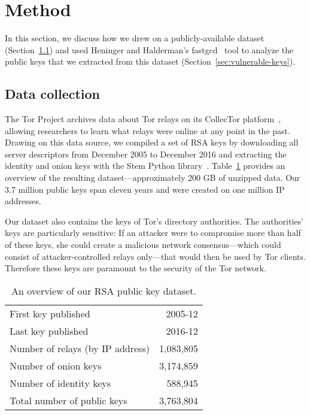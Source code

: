 \section{Method}
\label{sec:method}
In this section, we discuss how we drew on a publicly-available dataset
(Section~\ref{sec:data-collection}) and used Heninger and Halderman's 
fastgcd~\cite{fastgcd} tool to analyze the public keys that 
we extracted from this dataset (Section~\ref{sec:vulnerable-keys}).

\subsection{Data collection}
\label{sec:data-collection}
The Tor Project archives data about Tor relays on its CollecTor
platform~\cite{collector}, allowing researchers to learn what relays were online
at any point in the past.  Drawing on this data source, we compiled a set of RSA
keys by downloading all server descriptors from December 2005 to December 2016 
and extracting the identity and onion keys with the Stem Python
library~\cite{stem}.  Table~\ref{tab:dataset} provides an overview of the
resulting dataset---approximately 200 GB of unzipped data.  Our 3.7 million
public keys span eleven years and were created on one million IP addresses.

Our dataset also contains the keys of Tor's directory authorities.  The
authorities' keys are particularly sensitive: If an attacker were to compromise
more than half of these keys, she could create a malicious network
consensus---which could consist of attacker-controlled relays only---that would
then be used by Tor clients.  Therefore these keys are paramount to the security
of the Tor network.

\begin{table}[t]
	\caption{An overview of our RSA public key dataset.}
	\label{tab:dataset}
	\centering
	\begin{tabular}{l r}
	\toprule

	First key published & 2005-12 \\
	Last key published & 2016-12 \\

	\midrule

	Number of relays (by IP address) & 1,083,805 \\
	Number of onion keys & 3,174,859 \\
	Number of identity keys & 588,945 \\
	Total number of public keys & 3,763,804 \\

	\bottomrule
	\end{tabular}
\end{table}

